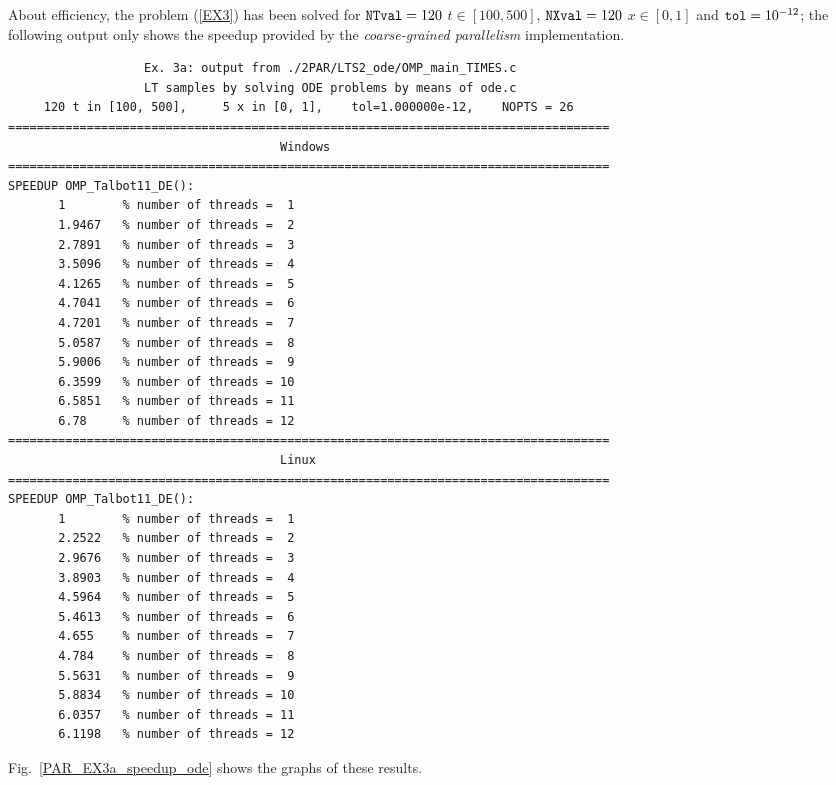 \documentclass[a4paper,10pt]{report}%
\begin{document}
About efficiency, the problem (\ref{EX3}) has been solved for ${\tt NTval}=120$ $t\in[100,500]$, ${\tt NXval}=120$
$x\in[0,1]$ and ${\tt tol}=10^{-12}$; the following output only shows the speedup provided by the
{\em coarse-grained parallelism} implementation.
\begin{lstlisting}
                   Ex. 3a: output from ./2PAR/LTS2_ode/OMP_main_TIMES.c
                   LT samples by solving ODE problems by means of ode.c
     120 t in [100, 500],     5 x in [0, 1],    tol=1.000000e-12,    NOPTS = 26
====================================================================================
                                      Windows
====================================================================================
SPEEDUP OMP_Talbot11_DE():
       1        % number of threads =  1
       1.9467   % number of threads =  2
       2.7891   % number of threads =  3
       3.5096   % number of threads =  4
       4.1265   % number of threads =  5
       4.7041   % number of threads =  6
       4.7201   % number of threads =  7
       5.0587   % number of threads =  8
       5.9006   % number of threads =  9
       6.3599   % number of threads = 10
       6.5851   % number of threads = 11
       6.78     % number of threads = 12
====================================================================================
                                      Linux
====================================================================================
SPEEDUP OMP_Talbot11_DE():
       1        % number of threads =  1
       2.2522   % number of threads =  2
       2.9676   % number of threads =  3
       3.8903   % number of threads =  4
       4.5964   % number of threads =  5
       5.4613   % number of threads =  6
       4.655    % number of threads =  7
       4.784    % number of threads =  8
       5.5631   % number of threads =  9
       5.8834   % number of threads = 10
       6.0357   % number of threads = 11
       6.1198   % number of threads = 12
\end{lstlisting}
Fig.~\ref{PAR_EX3a_speedup_ode} shows the graphs of these results.
\end{document}
